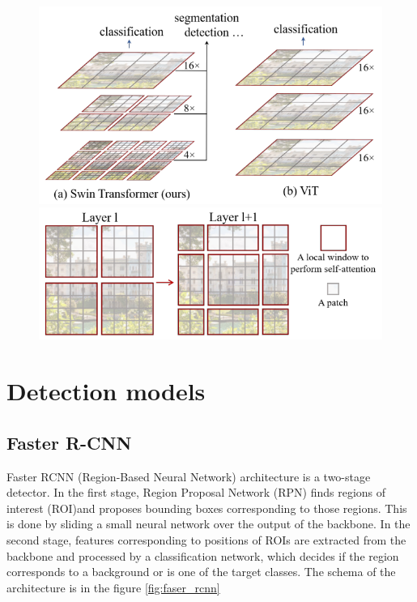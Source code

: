 \begin{figure}
    \begin{floatrow}[2]
        {\includegraphics[width=\linewidth]{images/swint_transformer_hierarchy.png}}\qquad
        {\includegraphics[width=\linewidth]{images/swint_transformer_patches.png}}
    \end{floatrow}
\end{figure}

\section{Detection models}
\label{sec:deteciton_models}

\subsection{Faster R-CNN}
Faster RCNN (Region-Based Neural Network) architecture is a two-stage detector. In the first stage, Region Proposal Network (RPN) finds regions of interest (ROI)and proposes bounding boxes corresponding to those regions. This is done by sliding a small neural network over the output of the backbone. In the second stage, features corresponding to positions of ROIs are extracted from the backbone and processed by a classification network, which decides if the region corresponds to a background or is one of the target classes. The schema of the architecture is in the figure \ref{fig:faser_rcnn}

